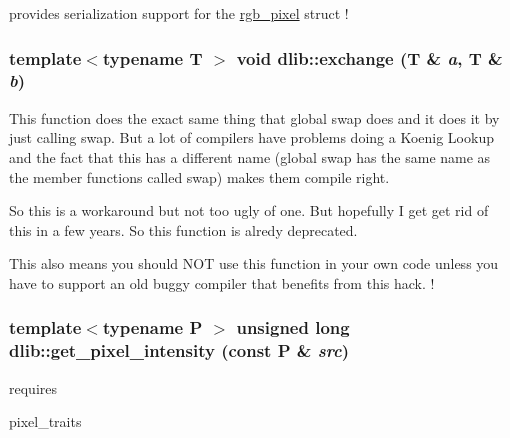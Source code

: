 provides serialization support for the \hyperlink{structdlib_1_1rgb__pixel}{rgb\_\-pixel} struct ! \hypertarget{namespacedlib_a7a50a190179be95c0d38aaa92960d1dc}{
\subsubsection[{exchange}]{\setlength{\rightskip}{0pt plus 5cm}template$<$typename T $>$ void dlib::exchange (T \& {\em a}, \/  T \& {\em b})}}
\label{namespacedlib_a7a50a190179be95c0d38aaa92960d1dc}
This function does the exact same thing that global swap does and it does it by just calling swap. But a lot of compilers have problems doing a Koenig Lookup and the fact that this has a different name (global swap has the same name as the member functions called swap) makes them compile right.

So this is a workaround but not too ugly of one. But hopefully I get get rid of this in a few years. So this function is alredy deprecated.

This also means you should NOT use this function in your own code unless you have to support an old buggy compiler that benefits from this hack. ! \hypertarget{namespacedlib_acadbad5cd1cbaf9f188eb56b518a0f01}{
\subsubsection[{get\_\-pixel\_\-intensity}]{\setlength{\rightskip}{0pt plus 5cm}template$<$typename P $>$ unsigned long dlib::get\_\-pixel\_\-intensity (const P \& {\em src})}}
\label{namespacedlib_acadbad5cd1cbaf9f188eb56b518a0f01}
requires
\begin{DoxyItemize}
\item pixel\_\-traits
\end{DoxyItemize}

